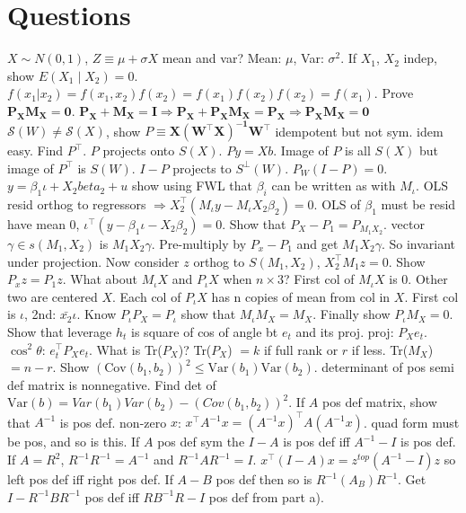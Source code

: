 \section{Questions}
\Q $X \sim N(0,1)$, $Z \equiv \mu + \sigma X$ mean and var? \A Mean: $\mu$, Var: $\sigma^2$.
\Q If $X_1$, $X_2$ indep, show $E(X_1 \mid X_2) = 0$.
\A $f(x_1 | x_2) = f(x_1,x_2)f(x_2) = f(x_1)f(x_2) f(x_2) = f(x_1)$.
\Q Prove $\mathbf{P_X M_X = 0}$.
\A $\mathbf{P_X + M_X = I \Rightarrow P_X + P_X M_X = P_X \Rightarrow P_X M_X = 0}$
\Q $\mathcal{S}(W) \neq \mathcal{S}(X)$, show $P \equiv \mathbf{X(W^{\top}X)^{-1}W^{\top}}$ idempotent but not sym.
\A idem easy.
Find $P^\top$.
$P$ projects onto $S(X)$.
$Py = Xb$.
Image of $P$ is all $S(X)$ but image of $P^{\top}$ is $S(W)$.
$I - P$ projects to $S^{\perp}(W)$.
$ P_W(I-P) = 0$.
\Q $y = \beta_1 \iota + X_2 beta_2 + u$ show using FWL that $\beta_i$ can be written as \hdots with $M_{\iota}$.
\A OLS resid orthog to regressors $\Rightarrow X_2 ^{\top} (M_{\iota} y - M_{\iota} X_2 \beta_2 ) = 0$.
OLS of $\beta_1$ must be resid have mean 0, $\iota^{\top} (y-\beta_1 \iota - X_2 \beta_2 ) = 0$.
\Q Show that $P_X - P_1 = P_{M_1 X_2}$.
\A vector $\gamma \in s(M_1, X_2)$ is $M_1 X_2 \gamma$.
Pre-multiply by $P_x - P_1$ and get $M_1 X_2 \gamma$.
So invariant under projection.
Now consider $z$ orthog to $S(M_1, X_2)$, $X_2 ^{\top} M_1 z = 0$.
Show $P_x z = P_1 z$.
\Q What about $M_{\iota}X$ and $P_{\iota} X$ when $n \times 3$?
\A First col of $M_{\iota} X$ is 0.
Other two are centered $X$.
Each col of $P_{\iota} X$ has n copies of mean from col in $X$.
First col is $\iota$, 2nd: $\bar{x_2}\iota$.
Know $P_{\iota} P_X = P_{\iota}$ show that $M_{\iota} M_X = M_X$.
Finally show $P_{\iota}M_{X} = 0$.
\Q Show that leverage $h_t$ is square of cos of angle bt $e_t$ and its proj.
\A proj: $P_X e_t$.
$\cos^2 \theta$: $e_t ^{\top} P_X e_t$.
\Q What is Tr($P_X$)?
\A Tr($P_X$) $= k$ if full rank or $r$ if less.
Tr($M_X$) $= n - r$.
\Q Show $(\text{Cov}(b_1,b_2))^2 \leq \text{Var}(b_1) \text{Var}(b_2)$.
\A determinant of pos semi def matrix is nonnegative.
Find det of $\text{Var}(b) = Var(b_1)Var(b_2) - (Cov(b_1,b_2))^2$.
\Q If $A$ pos def matrix, show that $A^{-1}$ is pos def.
\A non-zero $x$: $x^{\top} A^{-1} x = (A^{-1}x)^{\top} A (A^{-1} x)$.
quad form must be pos, and so is this.
\Q If $A$ pos def sym the $I - A$ is pos def iff $A^{-1} -I$ is pos def.
\A If $A = R^2$, $R^{-1}R^{-1} = A^{-1}$ and $R^{-1} A R^{-1} = I$.
$x^{\top}(I-A)x = z^{top}(A^{-1} - I)z$ so left pos def iff right pos def.
If $A - B$ pos def then so is $R^{-1} (A_B)R^{-1}$.
Get $I - R^{-1}BR^{-1}$ pos def iff $RB^{-1} R - I$ pos def from part a).
